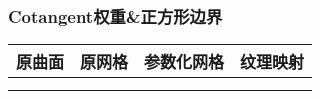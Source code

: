 \documentclass[14pt]{scrartcl} %
\begin{document}
	\pagebreak
	\subsubsection{Cotangent权重\&正方形边界}
	\begin{table}[h] %
		\centering %
		\begin{tabular}{l l l l}
			\toprule
			\centering
			\textbf{原曲面} & \textbf{原网格} & \textbf{参数化网格} &\textbf{纹理映射}\\
			\midrule
			\begin{minipage}[t]{0.2\linewidth}
				\centering
			\end{minipage}&
			\begin{minipage}[t]{0.2\linewidth}
				\centering
			\end{minipage}&
			\begin{minipage}[t]{0.2\linewidth}
				\centering
			\end{minipage}&
			\begin{minipage}[t]{0.2\linewidth}
				\centering
			\end{minipage}\\
			\begin{minipage}[t]{0.2\linewidth}
				\centering
			\end{minipage}&
			\begin{minipage}[t]{0.2\linewidth}
				\centering
			\end{minipage}&
			\begin{minipage}[t]{0.2\linewidth}
				\centering
			\end{minipage}&
			\begin{minipage}[t]{0.2\linewidth}
				\centering
			\end{minipage}\\
			

\end{tabular}
\end{table}
\end{document}
